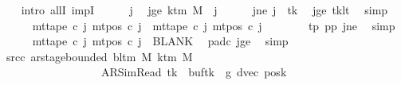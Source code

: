 \begin{isabellebody}
\ \ \isamarkupfalse%
\ {\isacharparenleft}{\kern0pt}intro\ allI\ impI{\isacharparenright}{\kern0pt}\isanewline
\ \ \ \ \isamarkupfalse%
\ j\ \isamarkupfalse%
\ jge{\isacharcolon}{\kern0pt}\ {\isachardoublequoteopen}k{\isacharunderscore}{\kern0pt}tm\ M\ {\isasymle}\ j{\isachardoublequoteclose}\isanewline
\ \ \ \ \isamarkupfalse%
\ jne{\isacharcolon}{\kern0pt}\ {\isachardoublequoteopen}j\ {\isasymnoteq}\ tk{\isachardoublequoteclose}\ \isamarkupfalse%
\ jge\ tk{\isacharunderscore}{\kern0pt}lt\ \isamarkupfalse%
\ simp\isanewline
\ \ \ \ \isamarkupfalse%
\ {\isachardoublequoteopen}mt{\isacharunderscore}{\kern0pt}tape\ c{}\ j\ {\isacharparenleft}{\kern0pt}mt{\isacharunderscore}{\kern0pt}pos\ c{}\ j{\isacharparenright}{\kern0pt}\ {\isacharequal}{\kern0pt}\ mt{\isacharunderscore}{\kern0pt}tape\ c{}\ j\ {\isacharparenleft}{\kern0pt}mt{\isacharunderscore}{\kern0pt}pos\ c{}\ j{\isacharparenright}{\kern0pt}{\isachardoublequoteclose}\isanewline
\ \ \ \ \ \ \isamarkupfalse%
\ tp{}\ pp{}\ jne\ \isamarkupfalse%
\ simp\isanewline
\ \ \ \ \isamarkupfalse%
\ {\isachardoublequoteopen}mt{\isacharunderscore}{\kern0pt}tape\ c{}\ j\ {\isacharparenleft}{\kern0pt}mt{\isacharunderscore}{\kern0pt}pos\ c{}\ j{\isacharparenright}{\kern0pt}\ {\isacharequal}{\kern0pt}\ BLANK{}{\isachardoublequoteclose}\ \isamarkupfalse%
\ pad{\isacharunderscore}{\kern0pt}c{}\ jge\ \isamarkupfalse%
\ simp\isanewline
\ \ \isamarkupfalse%
\isanewline
\ \ \isamarkupfalse%
\ src{\isacharunderscore}{\kern0pt}c{}{\isacharcolon}{\kern0pt}\ {\isachardoublequoteopen}ar{\isacharunderscore}{\kern0pt}stage{\isacharunderscore}{\kern0pt}bounded\ {\isacharparenleft}{\kern0pt}bl{\isacharunderscore}{\kern0pt}tm\ M{\isacharparenright}{\kern0pt}\ {\isacharparenleft}{\kern0pt}k{\isacharunderscore}{\kern0pt}tm\ M{\isacharparenright}{\kern0pt}\isanewline
\ \ \ \ \ \ \ \ \ \ \ \ \ \ \ \ \ \ {\isacharparenleft}{\kern0pt}AR{\isacharunderscore}{\kern0pt}SimRead{\isacharcomma}{\kern0pt}\ tk{\isacharcomma}{\kern0pt}\ {}{\isacharcomma}{\kern0pt}\ buf{\isacharparenleft}{\kern0pt}tk\ {\isacharcolon}{\kern0pt}{\isacharequal}{\kern0pt}\ {\isacharquery}{\kern0pt}g{}{\isacharparenright}{\kern0pt}{\isacharcomma}{\kern0pt}\ dvec{\isacharcomma}{\kern0pt}\ {\isacharquery}{\kern0pt}posk{\isacharprime}{\kern0pt}{\isacharparenright}{\kern0pt}{\isachardoublequoteclose}\isanewline

\end{isabellebody}
